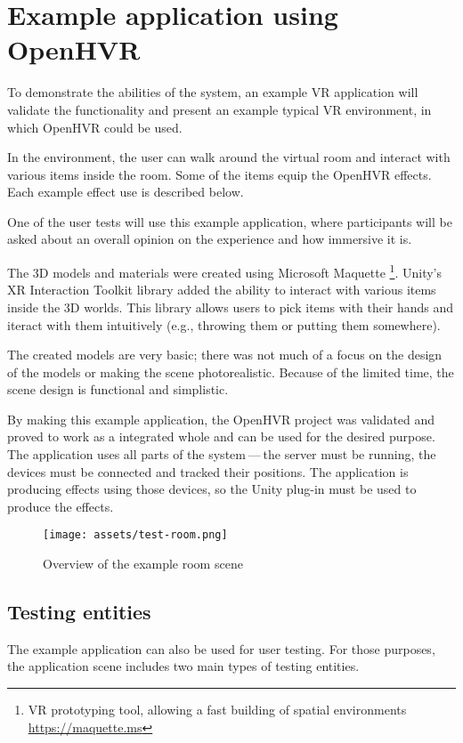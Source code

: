 \chapter{Example application using OpenHVR}

To demonstrate the abilities of the system, an example VR application
will validate the functionality and present an example typical VR
environment, in which OpenHVR could be used.

In the environment, the user can walk around the virtual room and interact with
various items inside the room. Some of the items equip the OpenHVR
effects. Each example effect use is described below.

One of the user tests will use this example application, where
participants will be asked about an overall opinion on the experience and
how immersive it is.


The 3D models and materials were created using Microsoft Maquette
\footnote{VR prototyping tool, allowing a fast building of spatial environments \href{https://maquette.ms}{https://maquette.ms}}.
Unity’s XR Interaction Toolkit library added the ability to
interact with various items inside the 3D worlds. This library allows users to
pick items with their hands and iteract with them intuitively (e.g., throwing them
or putting them somewhere).


The created models are very basic; there was not much of a focus on the design
of the models or making the scene photorealistic. Because of the limited time,
the scene design is functional and simplistic.


By making this example application, the OpenHVR project was validated and proved
to work as a integrated whole and can be used for the desired purpose. The application uses
all parts of the system — the server must be running, the devices must be
connected and tracked their positions. The application is producing effects
using those devices, so the Unity plug-in must be used to produce the effects.


\begin{figure}[h]{}
\centering\texttt{[image: assets/test-room.png]}
\caption{Overview of the example room scene}

\end{figure}

\hypertarget{x-testing-entities}{\section{Testing entities}}
The example application can also be used for user testing. For those purposes,
the application scene includes two main types of testing entities.



